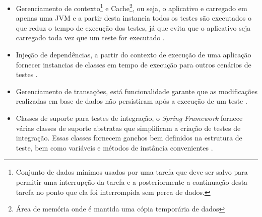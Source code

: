 \begin{itemize}
    \item Gerenciamento de contexto\footnote{Conjunto de dados mínimos usados por uma tarefa que deve ser salvo para permitir uma interrupção da tarefa e a posteriormente a continuação desta tarefa no ponto que ela foi interrompida sem perca de dados.} e Cache\footnote{Área de memória onde é mantida uma cópia temporária de dados}, ou seja, o aplicativo e carregado em apenas uma JVM e a partir desta instancia todos os testes são executados o que reduz o tempo de execução dos testes, já que evita que o aplicativo seja carregado toda vez que um teste for executado  \cite{spring}. 


\item Injeção de dependências, a partir do contexto de execução de uma aplicação fornecer instancias de classes em tempo de execução para outros cenários de testes  \cite{spring}. 


\item Gerenciamento de transações, está funcionalidade garante que as modificações realizadas em base de dados não persistiram após a execução de um teste  \cite{spring}. 



\item Classes de suporte para testes de integração, o \textit{Spring Framework} fornece várias classes de suporte abstratas que simplificam a criação de testes de integração. Essas classes fornecem ganchos bem definidos na estrutura de teste, bem como variáveis e métodos de instância convenientes  \cite{spring}.

\end{itemize}





